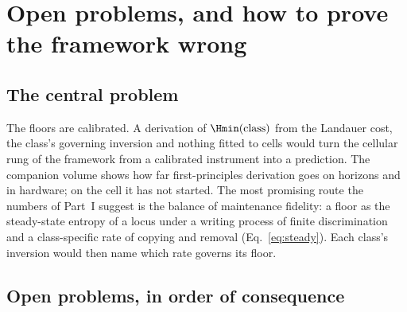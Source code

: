 \chapter{Open problems, and how to prove the framework wrong}\label{ch:open}

\section{The central problem}

The floors are calibrated. A derivation of $\Hmin(\text{class})$ from the Landauer cost, the class's governing inversion and nothing fitted to cells would turn the cellular
rung of the framework from a calibrated instrument into a prediction. The companion volume shows how far first-principles derivation goes on horizons and in hardware; on the cell
it has not started. The most promising route the numbers of Part~I suggest is the balance of maintenance fidelity: a floor as the steady-state entropy of a locus under a writing
process of finite discrimination and a class-specific rate of copying and removal (Eq.~\ref{eq:steady}). Each class's inversion would then name which rate governs its floor.

\section{Open problems, in order of consequence}

